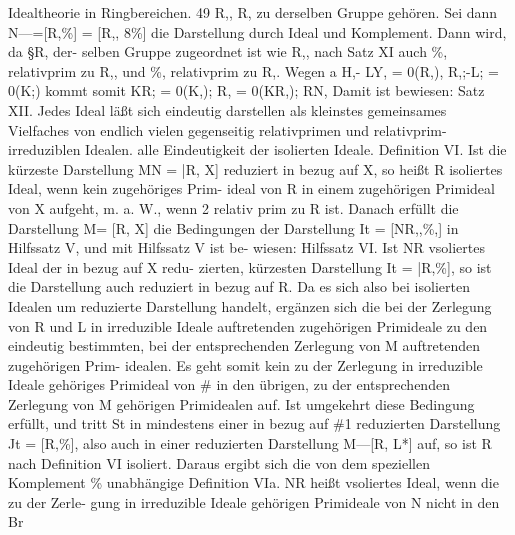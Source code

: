 \documentclass[11pt,a4paper]{article}
\theoremstyle{plain}
\theoremstyle{definition}
\begin{document}
Idealtheorie in Ringbereichen. 
49 
R,, R, zu derselben Gruppe gehören. 
Sei dann 
N---=[R,\%] = [R,, 8\%] 
die Darstellung durch Ideal und Komplement. 
Dann 
wird, da \S{}R, der- 
selben Gruppe zugeordnet ist wie R,, nach Satz XI auch \%, relativprim 
zu R,, und \%, relativprim zu R,. 
Wegen 
a 
H,- LY, = 0(R,), 
R,;-L; = 0(K;) 
kommt somit 
KR; = 0(K,); 
R, = 0(KR,); 
RN, 
Damit ist bewiesen: 
Satz XII. 
Jedes Ideal läßt sich eindeutig darstellen 
als kleinstes 
gemeinsames Vielfaches von endlich vielen gegenseitig relativprimen und 
relativprim-irreduziblen Idealen. 
alle 
Eindeutigkeit der isolierten Ideale. 
Definition VI. 
Ist die kürzeste Darstellung MN = |R, X] reduziert 
in bezug auf X, so heißt R isoliertes Ideal, wenn kein zugehöriges Prim- 
ideal von R in einem zugehörigen Primideal von X aufgeht, m. a. W., 
wenn 2 relativ prim zu R ist. 
Danach 
erfüllt 
die Darstellung M= [R, 
X] die Bedingungen 
der 
Darstellung It = [NR,,\%,] 
in Hilfssatz V, und mit Hilfssatz V ist be- 
wiesen: 
Hilfssatz VI. 
Ist NR vsoliertes 
Ideal der in bezug auf X redu- 
zierten, kürzesten Darstellung It = |R,\%], 
so ist die Darstellung auch 
reduziert in bezug auf R. 
Da 
es 
sich also 
bei isolierten 
Idealen um 
reduzierte Darstellung 
handelt, ergänzen sich die bei der Zerlegung von R und L in irreduzible 
Ideale auftretenden zugehörigen Primideale zu den eindeutig bestimmten, 
bei der entsprechenden Zerlegung von M auftretenden zugehörigen Prim- 
idealen. 
Es geht somit kein zu der Zerlegung in irreduzible Ideale gehöriges 
Primideal von \# in den übrigen, zu der entsprechenden Zerlegung von M 
gehörigen Primidealen auf. 
Ist umgekehrt diese Bedingung erfüllt, und tritt 
St in mindestens einer in bezug auf \#1 reduzierten Darstellung Jt = [R,\%], 
also auch 
in einer reduzierten Darstellung 
M---[R, L*] auf, 
so ist R 
nach Definition VI isoliert. 
Daraus 
ergibt sich 
die von dem speziellen 
Komplement \% unabhängige 
Definition VIa. 
NR heißt vsoliertes Ideal, wenn die zu der Zerle- 
gung 
in irreduzible Ideale gehörigen Primideale 
von N nicht in den 
Br
\end{document}
